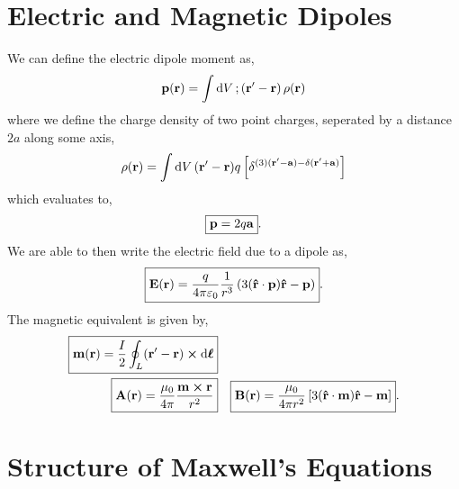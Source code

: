 \documentclass{book}
\begin{document}
\section{Electric and Magnetic Dipoles}
We can define the electric dipole moment as,
\begin{equation}
	\vb{p}(\vb{r}) = \int\dd{V};\left(\vb{r}'-\vb{r}\right)\rho(\vb{r})
\end{equation}
where we define the charge density of two point charges, seperated by a distance $2a$ along some axis,
\begin{equation}
	\rho(\vb{r}) = \int\dd{V}(\vb{r}'-\vb{r})q\left[\delta^{(3)(\vb{r}'-\vb{a}) - \delta(\vb{r}'+\vb{a})}\right]
\end{equation}
which evaluates to,
\begin{equation}
	\boxed{\vb{p} = 2q\vb{a}}.
\end{equation}
We are able to then write the electric field due to a dipole as,
\begin{equation}
	\boxed{\vb{E}(\vb{r})  = \frac{q}{4\pi \varepsilon_0} \frac{1}{r^3}\left(3(\vu{r}\cdot\vb{p})\vu{r} - \vb{p}\right)}.
\end{equation}
The magnetic equivalent is given by,
\begin{align}
	\boxed{ \vb{m}(\vb{r}) = \frac{I}{2} \oint_L (\vb{r}' - \vb{r})\cross \dd{\vb*{\ell}} } \\
	\boxed{ \vb{A}(\vb{r}) = \frac{\mu_0}{4\pi}\frac{\vb{m} \cross \vb{r}}{r^2} } && \boxed{ \vb{B}(\vb{r}) = \frac{\mu_0}{4\pi r^2}\left[3(\vu{r}\cdot{\vb{m}})\vu{r}-\vb{m}\right] }.
\end{align}
\section{Structure of Maxwell's Equations}
\end{document}

